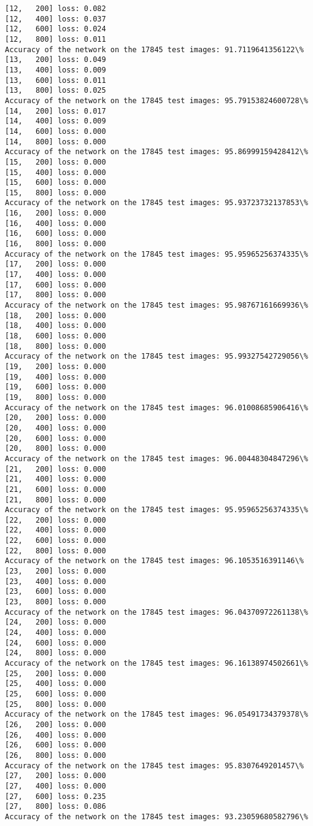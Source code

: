 \documentclass[11pt]{article}
\begin{document}
\begin{Verbatim}[commandchars=\\\{\}]
[12,   200] loss: 0.082
[12,   400] loss: 0.037
[12,   600] loss: 0.024
[12,   800] loss: 0.011
Accuracy of the network on the 17845 test images: 91.7119641356122\%
[13,   200] loss: 0.049
[13,   400] loss: 0.009
[13,   600] loss: 0.011
[13,   800] loss: 0.025
Accuracy of the network on the 17845 test images: 95.79153824600728\%
[14,   200] loss: 0.017
[14,   400] loss: 0.009
[14,   600] loss: 0.000
[14,   800] loss: 0.000
Accuracy of the network on the 17845 test images: 95.86999159428412\%
[15,   200] loss: 0.000
[15,   400] loss: 0.000
[15,   600] loss: 0.000
[15,   800] loss: 0.000
Accuracy of the network on the 17845 test images: 95.93723732137853\%
[16,   200] loss: 0.000
[16,   400] loss: 0.000
[16,   600] loss: 0.000
[16,   800] loss: 0.000
Accuracy of the network on the 17845 test images: 95.95965256374335\%
[17,   200] loss: 0.000
[17,   400] loss: 0.000
[17,   600] loss: 0.000
[17,   800] loss: 0.000
Accuracy of the network on the 17845 test images: 95.98767161669936\%
[18,   200] loss: 0.000
[18,   400] loss: 0.000
[18,   600] loss: 0.000
[18,   800] loss: 0.000
Accuracy of the network on the 17845 test images: 95.99327542729056\%
[19,   200] loss: 0.000
[19,   400] loss: 0.000
[19,   600] loss: 0.000
[19,   800] loss: 0.000
Accuracy of the network on the 17845 test images: 96.01008685906416\%
[20,   200] loss: 0.000
[20,   400] loss: 0.000
[20,   600] loss: 0.000
[20,   800] loss: 0.000
Accuracy of the network on the 17845 test images: 96.00448304847296\%
[21,   200] loss: 0.000
[21,   400] loss: 0.000
[21,   600] loss: 0.000
[21,   800] loss: 0.000
Accuracy of the network on the 17845 test images: 95.95965256374335\%
[22,   200] loss: 0.000
[22,   400] loss: 0.000
[22,   600] loss: 0.000
[22,   800] loss: 0.000
Accuracy of the network on the 17845 test images: 96.1053516391146\%
[23,   200] loss: 0.000
[23,   400] loss: 0.000
[23,   600] loss: 0.000
[23,   800] loss: 0.000
Accuracy of the network on the 17845 test images: 96.04370972261138\%
[24,   200] loss: 0.000
[24,   400] loss: 0.000
[24,   600] loss: 0.000
[24,   800] loss: 0.000
Accuracy of the network on the 17845 test images: 96.16138974502661\%
[25,   200] loss: 0.000
[25,   400] loss: 0.000
[25,   600] loss: 0.000
[25,   800] loss: 0.000
Accuracy of the network on the 17845 test images: 96.05491734379378\%
[26,   200] loss: 0.000
[26,   400] loss: 0.000
[26,   600] loss: 0.000
[26,   800] loss: 0.000
Accuracy of the network on the 17845 test images: 95.8307649201457\%
[27,   200] loss: 0.000
[27,   400] loss: 0.000
[27,   600] loss: 0.235
[27,   800] loss: 0.086
Accuracy of the network on the 17845 test images: 93.23059680582796\%

\end{Verbatim}
\end{document}
